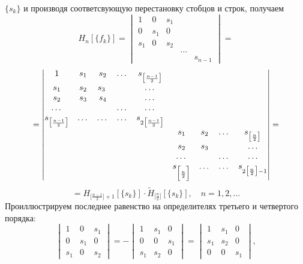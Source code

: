 \documentclass[12 pt, a4 paper]{article}
\theoremstyle{plain}   \newtheorem{Pro}{Задача}
\begin{document}
$  \{ s_k \} $
и производя соответсвующую перестановку стобцов и строк,
получаем
\begin{equation*}
  H_n [\{ f_k \} ]=
    \begin{vmatrix}
	  1 & 0 & s_1 & \; & \; \\
	  0 & s_1 & 0 & \; & \; \\
	  s_1 & 0 & s_2 & \; & \; \\
	  \; & \; & \; & \dots & \; \\
	  \; & \; & \; & \; & s_{n-1}
	\end{vmatrix}
  =
\end{equation*}
\begin{equation*}
  =
    \begin{vmatrix}
	  1 & s_1 & s_2 & \dots &
	   s_{\bigl [ \frac{n-1}{2} \bigr ] } &
	    \; & \; & \; & \; \\
	  s_1 & s_2 & s_3 \; & \; & \dots &
	   \; & \; & \; & \; \\
	  s_2 & s_3 & s_4 & \; & \dots &
	   \; & \; & \; & \; \\
	   \dots & \; & \; & \dots & \dots &
	   \; & \; & \; & \; \\
	  s_{\bigl [ \frac{n-1}{2} \bigr ] } &
	   \dots & \dots & \dots & s_{2 \bigl [ \frac{n-1}{2} \bigr ] } &
	    \; & \; & \; & \; \\
	       \; & \; & \; & \; & \; &
		           s_1 & s_2 & \dots &
				      s_{\bigl [\frac{n}{2}\bigr ] } \\
		   \; & \; & \; & \; & \; &
		           s_2 & s_3 & \; & \dots \\
		   \; & \; & \; & \; & \; &
		           \dots & \; & \dots & \dots \\
		   \; & \; & \; & \; & \; &
		           s_{ \Bigl [\frac{n}{2} \Bigr ] }
				   & \dots & \dots &
				     s_{2 \bigl [ \frac{n}{2} \bigr ] -1 }
	 \end{vmatrix}
   =
\end{equation*}
\begin{equation*}
  = H_{\bigl [ \frac{n-1}{2} \bigr ] +1} [ \{ s_k \} ] \cdot
    \tilde H_{ \bigl [ \frac{n}{2} \bigr ] } [ \{ s_k \} ] ,
	  \quad n=1,2,...
\end{equation*}
Проиллюстрируем последнее равенство на определителях
третьего и четвертого порядка:
\begin{equation*}
  \begin{vmatrix}
    1 & 0 & s_1 \\
	0 & s_1 & 0 \\
	s_1 & 0 & s_2
  \end{vmatrix}
  =-
  \begin{vmatrix}
    1 & s_1 & 0 \\
	0 & 0 & s_1 \\
	s_1 & s_2 & 0
  \end{vmatrix}
  =
  \begin{vmatrix}
    1 & s_1 & 0 \\
	s_1 & s_2 & 0 \\
	0 & 0 & s_1
   \end{vmatrix}
   ,
\end{equation*}
\end{document}
